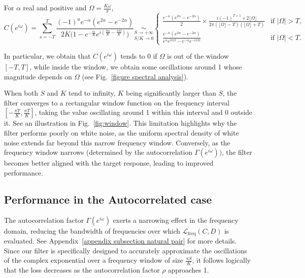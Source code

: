 \begin{theorem}\label{convergence to window}
     For $\alpha$ real and positive and $\Omega=\frac{K\omega }{\pi}$, 
     \[C(e^{i\omega}) = 
\sum_{s=-T}^{T} \frac{(-1)^u e^{-\alpha}(e^{2\alpha} - e^{-2\alpha})}{2K \big(1 - e^{-\frac{\alpha}{K}} e^{i(\frac{\pi u}{K}-\frac{\pi\Omega}{K})}\big)} \underset{S/K\rightarrow 0}{\underset{S\rightarrow+\infty}{\sim} }
\begin{cases} 
\frac{e^{-\alpha}(e^{2\alpha}-e^{-2\alpha})}{2}\times\frac{i(-1)^{T+1}\times 2\lfloor\Omega\rfloor}{2\pi(\lfloor\Omega\rfloor-T)(\lfloor\Omega\rfloor+T)} & \text{if } \vert\Omega\vert > T, \\
\frac{e^{-\alpha}(e^{2\alpha}-e^{-2\alpha})}{e^{\alpha}e^{i\pi\Omega}-e^{-\alpha}e^{-i\pi\Omega}} & \text{if } \vert\Omega\vert < T.
\end{cases}
\]
\end{theorem}
In particular, we obtain that $C(e^{i\omega})$ tends to $0$ if $\Omega$ is out of the window $[-T, T]$, while  inside the window, we obtain some oscillations around 1 whose magnitude depends on $\Omega$ (see Fig.~\ref{figure spectral analysis}).


When both $S$ and $K$ tend to infinity, $K$ being significantly larger than $S$, the filter converges to a rectangular window function on the frequency interval $[-\frac{\pi T}{K}, \frac{\pi T}{K}]$, taking the value oscillating around 1 within this interval and 0 outside it. See an illustration in Fig.~\ref{fig:window}. This limitation highlights why the filter performs poorly on white noise, as the uniform spectral density of white noise extends far beyond this narrow frequency window. Conversely, as the frequency window narrows (determined by the autocorrelation $\Gamma(e^{i\omega}))$, the filter becomes better aligned with the target response, leading to improved performance. 

\subsection{Performance in the Autocorrelated case}

The autocorrelation factor \(\Gamma(e^{i\omega})\) exerts a narrowing effect in the frequency domain, reducing the bandwidth of frequencies over which $\mathcal{L}_\text{freq}(C, D)$ is evaluated. See Appendix~\ref{appendix subsection natural pair} for more details. Since our filter is specifically designed to accurately approximate the oscillations of the complex exponential over a frequency window of size \(\frac{\pi S}{K}\), it follows logically that the loss decreases as the autocorrelation factor \(\rho\) approaches 1.

